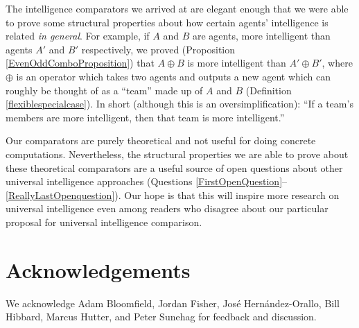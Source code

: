 \documentclass[twoside,11pt]{article}
\begin{document}
The intelligence comparators we arrived at are elegant enough that
we were able to prove some structural properties about how certain agents'
intelligence is related \emph{in general}. For example, if $A$ and $B$ are
agents, more intelligent than agents $A'$ and $B'$ respectively, we proved
(Proposition \ref{EvenOddComboProposition}) that
$A\oplus B$ is more intelligent than $A'\oplus B'$, where $\oplus$ is an
operator which takes two agents and outputs a new agent which can roughly
be thought of as a ``team'' made up of $A$ and $B$
(Definition \ref{flexiblespecialcase}).
In short (although this is an oversimplification):
``If a team's members are more intelligent, then that team is more intelligent.''

Our comparators are purely theoretical and not useful
for doing concrete computations. Nevertheless, the structural
properties we are able to prove about these theoretical comparators
are a useful source of open questions about other universal
intelligence approaches (Questions \ref{FirstOpenQuestion}--\ref{ReallyLastOpenquestion}).
Our hope is that this will inspire more research on universal intelligence
even among readers who disagree about our particular proposal
for universal intelligence comparison.

\section*{Acknowledgements}


We acknowledge Adam Bloomfield, Jordan Fisher,
Jos{\'e} Hern{\'a}ndez-Orallo,
Bill Hibbard, Marcus Hutter, and Peter Sunehag for feedback and discussion.



\end{document}
